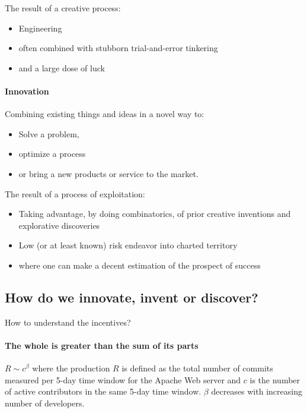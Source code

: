 The result of a creative process:
\begin{itemize}
    \item Engineering
    \item often combined with stubborn trial-and-error tinkering
    \item and a large dose of luck
\end{itemize}

\paragraph{Innovation}

Combining existing things and ideas in a novel way to:
\begin{itemize}
    \item Solve a problem,
    \item optimize a process
    \item or bring a new products or service to the market.
\end{itemize}

The result of a process of exploitation:
\begin{itemize}
    \item Taking advantage, by doing combinatorics, of prior creative inventions
        and explorative discoveries
    \item Low (or at least known) risk endeavor into charted territory
    \item where one can make a decent estimation of the prospect of success
\end{itemize}

\subsection{How do we innovate, invent or discover?}

How to understand the incentives?

\paragraph{The whole is greater than the sum of its parts}

$R \sim c^\beta$ where the production $R$ is defined as the total number
of commits measured per 5-day time window for the Apache Web server and
$c$ is the number of active contributors in the same 5-day time window.
$\beta$ decreases with increasing number of developers.

\vspace{1\baselineskip}

